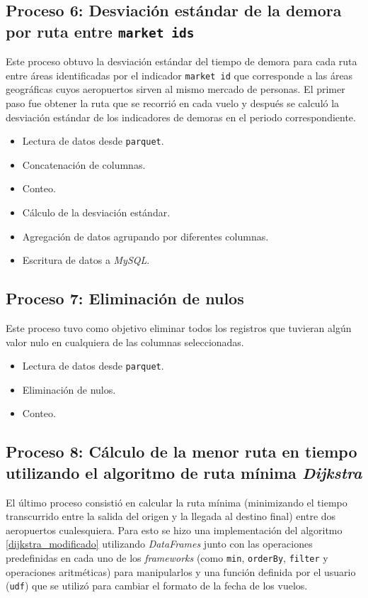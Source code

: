 \subsection{Proceso 6: Desviación estándar de la demora por ruta entre \texttt{market ids}}

Este proceso obtuvo la desviación estándar del tiempo de demora para cada ruta entre áreas identificadas por el indicador \texttt{market id} que corresponde a las áreas geográficas cuyos aeropuertos sirven al mismo mercado de personas. El primer paso fue obtener la ruta que se recorrió en cada vuelo y después se calculó la desviación estándar de los indicadores de demoras en el periodo correspondiente.

\begin{itemize}
	\item Lectura de datos desde \texttt{parquet}.
	\item Concatenación de columnas.
	\item Conteo.
	\item Cálculo de la desviación estándar.
	\item Agregación de datos agrupando por diferentes columnas.
	\item Escritura de datos a \textit{MySQL}.
\end{itemize}

\subsection{Proceso 7: Eliminación de nulos}

Este proceso tuvo como objetivo eliminar todos los registros que tuvieran algún valor nulo en cualquiera de las columnas seleccionadas. 

\begin{itemize}
	\item Lectura de datos desde \texttt{parquet}.
	\item Eliminación de nulos.
	\item Conteo.
\end{itemize}

\subsection{Proceso 8: Cálculo de la menor ruta en tiempo utilizando el algoritmo de ruta mínima \textit{Dijkstra}}

El último proceso consistió en calcular la ruta mínima (minimizando el tiempo transcurrido entre la salida del origen y la llegada al destino final) entre dos aeropuertos cualesquiera. Para esto se hizo una implementación del algoritmo \ref{dijkstra_modificado} utilizando \textit{DataFrames} junto con las operaciones predefinidas en cada uno de los \textit{frameworks} (como \texttt{min}, \texttt{orderBy}, \texttt{filter} y operaciones aritméticas) para manipularlos y una función definida por el usuario (\texttt{udf}) que se utilizó para cambiar el formato de la fecha de los vuelos.

